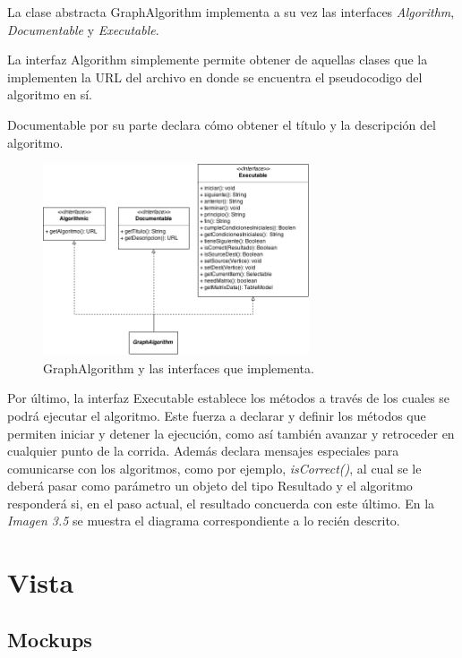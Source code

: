 \documentclass{book}
\begin{document}
La clase abstracta GraphAlgorithm implementa a su vez las interfaces \textit{Algorithm}, \textit{Documentable} y \textit{Executable}. 
\par
La interfaz Algorithm simplemente permite obtener de aquellas clases que la implementen la URL del archivo en donde se encuentra el pseudocodigo del algoritmo en sí.
\par
Documentable por su parte declara cómo obtener el título y la descripción del algoritmo.
\bigskip


\begin{figure}[H]
	\centering
	\includegraphics[width=0.70\textwidth]{images/01-02.png}
	\medskip
	\caption{GraphAlgorithm y las interfaces que implementa.}
	\medskip
\end{figure}
\bigskip

Por último, la interfaz Executable establece los métodos a través de los cuales se podrá ejecutar el algoritmo. Este fuerza a declarar y definir los métodos que permiten iniciar y detener la ejecución, como así también avanzar y retroceder en cualquier punto de la corrida. Además declara mensajes especiales para comunicarse con los algoritmos, como por ejemplo, \textit{isCorrect()}, al cual se le deberá pasar como parámetro un objeto del tipo Resultado y el algoritmo responderá si, en el paso actual, el resultado concuerda con este último. En la \textit{Imagen 3.5} se muestra el diagrama correspondiente a lo recién descrito.
\bigskip


\section{Vista}

\subsection{Mockups}
\end{document}
